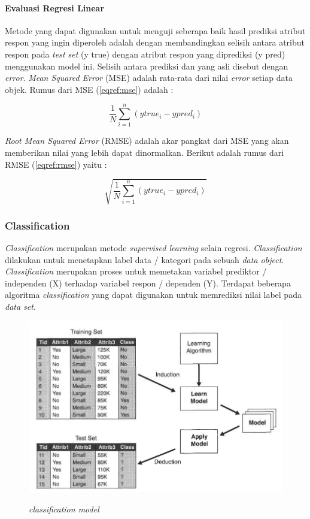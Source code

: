 \documentclass[a4paper,twoside]{article}
\begin{document}
\begin{enumerate}
\paragraph{Evaluasi Regresi Linear}
Metode yang dapat digunakan untuk menguji seberapa baik hasil prediksi atribut respon yang ingin diperoleh adalah dengan membandingkan selisih antara atribut respon pada \textit{test set} (y true) dengan atribut respon yang diprediksi (y pred) menggunakan model ini. Selisih antara prediksi dan yang asli disebut dengan \textit{error}. \textit{Mean Squared Error} (MSE) adalah rata-rata dari nilai \textit{error} setiap data objek. Rumus dari MSE (\ref{eqref:mse}) adalah : 


\begin{equation}
  \frac{1}{N}\sum_{i=1}^{n} (y true_i - y pred_i)
  \label{eqref:mse}
\end{equation}

\textit{Root Mean Squared Error} (RMSE) adalah akar pangkat dari MSE yang akan memberikan nilai yang lebih dapat dinormalkan. Berikut adalah rumus dari RMSE (\ref{eqref:rmse}) yaitu : 

\begin{equation}
 \sqrt{\frac{1}{N}\sum_{i=1}^{n} (y true_i - y pred_i)}
  \label{eqref:rmse}
\end{equation}

		
		
		\subsubsection{Classification}
\textit{Classification} merupakan metode \textit{supervised learning} selain regresi. \textit{Classification} dilakukan untuk menetapkan label data / kategori pada sebuah \textit{data object}. \textit{Classification} merupakan proses untuk memetakan variabel prediktor / independen (X) terhadap variabel respon / dependen (Y). Terdapat beberapa algoritma \textit{classification} yang dapat digunakan untuk memrediksi nilai label pada \textit{data set}. 
\pagebreak
\begin{figure}[h!]
	\centering  
	\includegraphics[scale=0.4]{classificationmodel}   
	\label{fig:classificationprocess} 
	\caption{\textit{classification model}}
\end{figure} 


\end{enumerate}
\end{document}
